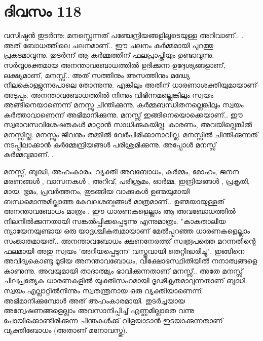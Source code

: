  
\section{ദിവസം 118}


വസിഷ്ഠന്‍ തുടര്‍ന്നു: മനസ്സെന്നത്‌ പഞ്ചേന്ദ്രിയങ്ങളിലൂടെയുള്ള അറിവാണ്‌.. . അത്‌ ബോധത്തിലെ ചലനമാണ്‌.. ഈ ചലനം കര്‍മ്മമായി പുറത്തു പ്രകടമാവുന്നു. തുടര്‍ന്ന് ആ കര്‍മ്മത്തിന്‌ ഫലപ്രാപ്തിയും ഉണ്ടാവുന്നു. സര്‍വ്വശക്തമായ അനന്താവബോധത്തില്‍ ഉദിക്കുന്ന ഉദ്ദേശ്യങ്ങളാണ്‌, ലക്ഷ്യമാണ്‌, മനസ്സ്‌.. അത്‌ സത്തിനും അസത്തിനും മദ്ധ്യേ നിലകൊള്ളുന്നപോലെ തോന്നുന്നു. എങ്കിലും അതിന്‌ ധാരണാശക്തിയുമായാണ്‌ അടുപ്പം. അനന്താവബോധത്തില്‍ നിന്നും വിഭിന്നമല്ലെങ്കിലും സ്വയം അങ്ങിനെയാണെന്ന് മനസ്സു ചിന്തിക്കുന്നു. കര്‍മ്മബന്ധിതനല്ലെങ്കിലും സ്വയം കര്‍ത്താവാണെന്ന് അഭിമാനിക്കുന്നു. മനസ്സ്‌ ഇങ്ങിനെയൊക്കെയാണ്‌.. ഈ സ്വഭാവസവിശേഷതകള്‍ മാറ്റാന്‍ സാധിക്കുകയില്ല. കാരണം, അവയില്ലെങ്കില്‍ മനസ്സില്ല. മനസ്സും ജീവനും തമ്മില്‍ വേര്‍പിരിക്കാനാവില്ല. മനസ്സില്‍ ചിന്തിക്കുന്നത്‌ നടപ്പിലാക്കാന്‍ കര്‍മ്മേന്ദ്രിയങ്ങള്‍ പരിശ്രമിക്കുന്നു. അപ്പോള്‍ മനസ്സ്‌ കര്‍മ്മവുമാണ്‌. .

മനസ്സ്‌, ബുദ്ധി, അഹംകാരം, വ്യക്തി അവബോധം, കര്‍മ്മം, മോഹം, ജനന മരണങ്ങള്‍ , വാസനകള്‍ , അറിവ്‌, പരിശ്രമം, ഓര്‍മ്മ, ഇന്ദ്രിയങ്ങള്‍ , പ്രകൃതി, മായ, ഭ്രമം, പ്രവര്‍ത്തനം, തുടങ്ങിയ വാക്കുകള്‍ ഉണ്മയുമായി ബന്ധമൊന്നുമില്ലാത്ത കേവലശബ്ദങ്ങള്‍ മാത്രമാണ്‌.. ഉണ്മയായുള്ളത്‌ അനന്താവബോധം മാത്രം .  ഈ ധാരണകളെല്ലാം ആ അവബോധത്തില്‍ നിലനില്‍ക്കുന്നതായി സങ്കല്‍പ്പിക്കപ്പെടുന്നു എന്നുമാത്രം. "കാകതാലീയ ന്യായേനയുണ്ടായ ഒരു യാദൃശ്ചികത്വമായാണ്‌ മേല്‍പ്പറഞ്ഞ ധാരണകളെല്ലാം സംജാതമായത്‌.. അനന്താവബോധം ക്ഷണനേരത്ത്‌ സ്വരൂപത്തെ മറന്നതിന്റെ ഫലമായി അതു സ്വയം 'അറിയപ്പെടുന്ന' വസ്തുവായി തെറ്റിദ്ധരിച്ചു". ഇങ്ങിനെ അവിദ്യകൊണ്ടു മൂടിയ അനന്താവബോധം, വിക്ഷോഭസ്ഥിതിയില്‍ നനാത്വങ്ങളെ കാണുന്നു. അവയുമായി താദാത്മ്യം ഭാവിക്കുന്നതാണ്‌ മനസ്സ്‌.. അതേ മനസ്സ്‌ ചിലപ്രത്യേക ധാരണകളില്‍ യുക്തിസഹമായി ദൃഢീകൃതമാവുന്നതാണ്‌ ബുദ്ധി. സ്വയം എല്ലാറ്റില്‍നിന്നും സ്വതന്ത്രനായ ഒരു വ്യക്തിയാണെന്ന് അഭിമാനിക്കുമ്പോള്‍ അത്‌ അഹംകാരമായി. തുടര്‍ച്ചയായ അന്വേഷണങ്ങളെല്ലാം അവസാനിപ്പിച്ച്‌ എണ്ണമില്ലാതെ വന്നു പോയിക്കൊണ്ടിരിക്കുന്ന ചിന്തകള്‍ക്ക്‌ വിളയാടാന്‍ ഇടയാക്കുന്നതാണ്‌ വ്യക്തിബോധം (അതാണ് മനോവസ്തു).

